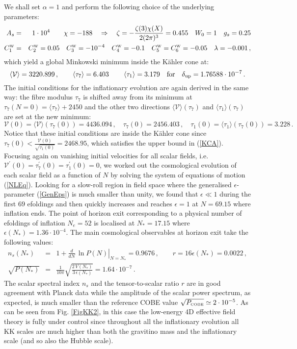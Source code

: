\documentclass[11pt,a4paper]{article}
\newcommand{\bea}{\begin{eqnarray}}
\newcommand{\eea}{\end{eqnarray}}
\newcommand{\be}{\begin{equation}}
\newcommand{\ee}{\end{equation}}
\def\nn{\nonumber}
\def\W{{\scriptscriptstyle \rm W}}
\newcommand\vo{{\mathcal{V}}}
\begin{document}
We shall set $\alpha=1$ and perform the following choice of the underlying parameters:
\bea
A_s &=& 1\cdot 10^4 \qquad \chi=-188 \quad\Rightarrow \quad \zeta = -\frac{\zeta(3) \chi(X)}{2 (2\pi)^3} = 0.455 \quad W_0 = 1 \quad g_s = 0.25 \nn \\
C_1^\W &=& C_2^\W = 0.05 \quad C_3^\W = -10^{-4} \quad C_4^\W = -0.1 \quad C_5^\W=C_6^\W = -0.05 \quad \lambda = -0.001\,, \nn
\eea
which yield a global Minkowski minimum inside the K\"ahler cone at:
\be
\langle \vo\rangle = 3220.899\,,\qquad \langle\tau_7\rangle = 6.403\,\qquad \langle \tau_1\rangle = 3.179\quad\text{for}\quad 
\delta_{\rm up} = 1.76588\cdot 10^{-7}\,. \nn
\ee
The initial conditions for the inflationary evolution are again derived in the same way: the fibre modulus $\tau_7$ is shifted away from its minimum at $\tau_7 (N=0) = \langle\tau_7\rangle + 2450$ and the other two directions $\langle \vo\rangle(\tau_7)$ and $\langle\tau_1\rangle(\tau_7)$ are set at the new minimum:
\be
\vo(0) = \langle \vo\rangle (\tau_7(0)) = 4436.094\,,\quad \tau_7(0) = 2456.403\,,
\quad\tau_1(0) = \langle \tau_1\rangle(\tau_7(0)) = 3.228 \,. \nn
\ee
Notice that these initial conditions are inside the K\"ahler cone since $\tau_7(0) < \frac{\vo(0)}{\sqrt{\tau_1(0)}} = 2468.95$, which satisfies the upper bound in (\ref{KCA}). Focusing again on vanishing initial velocities for all scalar fields, i.e. $\vo^\prime (0) = \tau_7^\prime (0) = \tau_1^\prime(0) = 0$, we worked out the cosmological evolution of each scalar field as a function of $N$ by solving the system of equations of motion (\ref{NLEq}). Looking for a slow-roll region in field space where the generalised $\epsilon$-parameter (\ref{GenEps}) is much smaller than unity, we found that $\epsilon\ll 1$ during the first $69$ efoldings and then quickly increases and reaches $\epsilon = 1$ at $N=69.15$ where inflation ends. The point of horizon exit corresponding to a physical number of efoldings of inflation $N_e = 52$ is localised at $N_* = 17.15$ where $\epsilon (N_*) = 1.36\cdot 10^{-4}$. The main cosmological observables at horizon exit take the following values:
\bea
n_s (N_*) &=& 1 + \left.\frac{d}{dN}\,\ln P(N)\right|_{N=N_*} = 0.9676\,, \qquad r = 16 \epsilon(N_*) = 0.0022\,, \nn \\
\sqrt{P(N_*)} &=& \frac{1}{10\pi}\sqrt{\frac{2\,V(N_*)}{3\,\epsilon(N_*)}} = 1.64 \cdot 10^{-7}\,. \nn
\eea
The scalar spectral index $n_s$ and the tensor-to-scalar ratio $r$ are in good agreement with Planck data \cite{Ade:2015lrj, Ade:2015xua} while the amplitude of the scalar power spectrum, as expected, is much smaller than the reference COBE value $\sqrt{P_{\scriptscriptstyle{\rm COBE}}}\simeq 2\cdot 10^{-5}$. As can be seen from Fig. \ref{FigKK2}, in this case the low-energy 4D effective field theory is fully under control since throughout all the inflationary evolution all KK scales are much higher than both the gravitino mass and the inflationary scale (and so also the Hubble scale).
\end{document}
